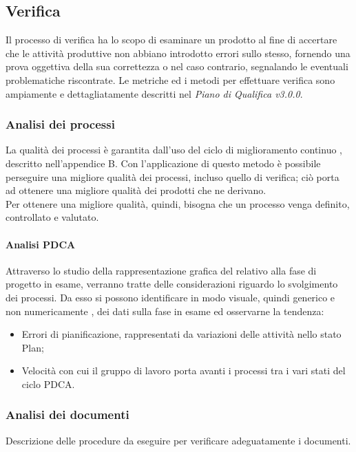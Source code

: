 \subsection{Verifica}
Il processo di verifica ha lo scopo di esaminare un prodotto al fine di accertare che le attività produttive non abbiano introdotto errori sullo stesso, fornendo una prova oggettiva della sua correttezza o nel caso contrario, segnalando le eventuali problematiche riscontrate. Le metriche ed i metodi per effettuare verifica sono ampiamente e dettagliatamente descritti nel \emph{Piano di Qualifica v3.0.0}.

\subsubsection{Analisi dei processi}
La qualità dei processi è garantita dall'uso del ciclo di miglioramento continuo , descritto nell'appendice B. Con l'applicazione di questo metodo è possibile perseguire una migliore qualità dei processi, incluso quello di verifica; ciò porta ad ottenere una migliore qualità dei prodotti che ne derivano. \\
Per ottenere una migliore qualità, quindi, bisogna che un processo venga definito, controllato e valutato.

\paragraph{Analisi PDCA} \Spazio
Attraverso lo studio della rappresentazione grafica del  relativo alla fase di progetto in esame, verranno tratte delle considerazioni riguardo lo svolgimento dei processi.
Da esso si possono identificare in modo visuale, quindi generico e non numericamente , dei dati sulla fase in esame ed osservarne la tendenza:
\begin{itemize}
	\item Errori di pianificazione, rappresentati da variazioni delle attività nello stato
	Plan;
	\item Velocità con cui il gruppo di lavoro porta avanti i processi tra i vari stati del
	ciclo PDCA.
\end{itemize}


\subsubsection{Analisi dei documenti}
 Descrizione delle procedure da eseguire per verificare adeguatamente i documenti.


